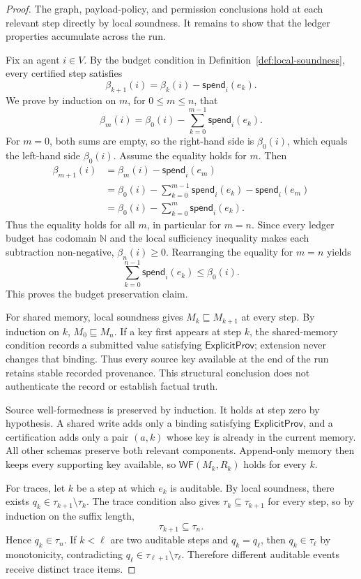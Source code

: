 \documentclass[a4paper,fleqn]{cas-sc}
\newcommand{\Nat}{\mathbb{N}}
\begin{document}
\begin{proof}
The graph, payload-policy, and permission conclusions hold at each relevant
step directly by local soundness. It remains to show that the ledger properties
accumulate across the run.

Fix an agent \(i\in V\). By the budget condition in Definition~\ref{def:local-soundness}, every certified step satisfies
\[
  \beta_{k+1}(i)=\beta_k(i)-\mathsf{spend}_i(e_k).
\]
We prove by induction on \(m\), for \(0\le m\le n\), that
\[
  \beta_m(i)=\beta_0(i)-\sum_{k=0}^{m-1}\mathsf{spend}_i(e_k).
\]
For \(m=0\), both sums are empty, so the right-hand side is \(\beta_0(i)\), which equals the left-hand side \(\beta_0(i)\). Assume the equality holds for \(m\). Then
\[
\begin{aligned}
  \beta_{m+1}(i)
  &=\beta_m(i)-\mathsf{spend}_i(e_m)\\
  &=\beta_0(i)-\sum_{k=0}^{m-1}\mathsf{spend}_i(e_k)-\mathsf{spend}_i(e_m)\\
  &=\beta_0(i)-\sum_{k=0}^{m}\mathsf{spend}_i(e_k).
\end{aligned}
\]
Thus the equality holds for all \(m\), in particular for \(m=n\). Since every ledger budget has codomain \(\Nat\) and the local sufficiency inequality makes each subtraction non-negative, \(\beta_n(i)\ge0\). Rearranging the equality for \(m=n\) yields
\[
  \sum_{k=0}^{n-1} \mathsf{spend}_i(e_k)
  \le \beta_0(i).
\]
This proves the budget preservation claim.

For shared memory, local soundness gives \(M_k\sqsubseteq M_{k+1}\) at every
step. By induction on \(k\), \(M_0\sqsubseteq M_n\). If a key first appears at
step \(k\), the shared-memory condition records a submitted value satisfying
\(\mathsf{ExplicitProv}\); extension never changes that binding. Thus every source key
available at the end of the run retains stable recorded provenance. This
structural conclusion does not authenticate the record or establish factual
truth.

Source well-formedness is preserved by induction. It holds at step zero by
hypothesis. A shared write adds only a binding satisfying
\(\mathsf{ExplicitProv}\), and a
certification adds only a pair \((a,k)\) whose key is already in the current
memory. All other schemas preserve both relevant components. Append-only memory
then keeps every supporting key available, so
\(\mathsf{WF}(M_k,R_k)\) holds for every \(k\).

For traces, let \(k\) be a step at which \(e_k\) is auditable. By local soundness, there exists \(q_k\in\tau_{k+1}\setminus\tau_k\). The trace condition also gives \(\tau_k\subseteq\tau_{k+1}\) for every step, so by induction on the suffix length,
\[
  \tau_{k+1}\subseteq\tau_n.
\]
Hence \(q_k\in\tau_n\). If \(k<\ell\) are two auditable steps and \(q_k=q_\ell\), then \(q_k\in\tau_{\ell}\) by monotonicity, contradicting \(q_\ell\in\tau_{\ell+1}\setminus\tau_{\ell}\). Therefore different auditable events receive distinct trace items.


\end{proof}
\end{document}
